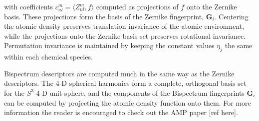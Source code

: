 with coefficients $c_{nl}^m = \langle Z_{nl}^m, f \rangle$
computed as projections of $f$ onto the Zernike basis.
These projections form the basis of the Zernike fingerprint,
$\bm{G}_i$. Centering the atomic density preserves translation
invariance of the atomic environment, while the projections
onto the Zernike basis set preserves rotational invariance.
Permutation invariance is maintained by keeping the constant values
$\eta_j$ the same within each chemical species.
\par
Bispectrum descriptors are computed much in the same way
as the Zernike descriptors. The 4-D spherical harmonics
form a complete, orthogonal basis set for the $S^3$ 4-D unit
sphere, and the components of the Bispectrum fingerprints
$\bm{G}_i$ can be computed by projecting the atomic
density function onto them. For more information
the reader is encouraged to check out the AMP paper [ref here].
